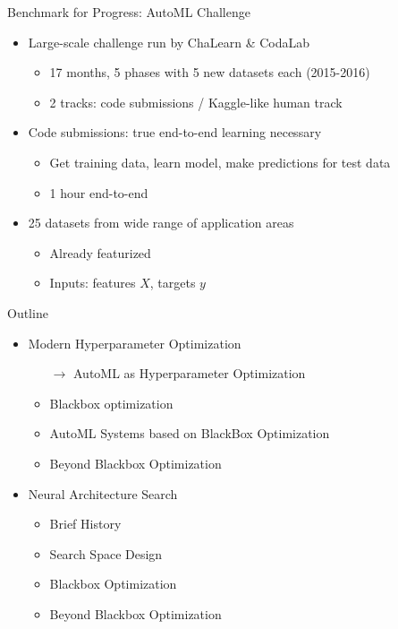 \begin{frame}[c]{Benchmark for Progress: AutoML Challenge}
\begin{itemize}
	\item \alert{Large-scale challenge run by ChaLearn \& CodaLab}
	\begin{itemize}
		\item 17 months, 5 phases with 5 new datasets each (2015-2016)
		\item 2 tracks: code submissions / Kaggle-like human track
	\end{itemize}
	\item \alert{Code submissions: true end-to-end learning necessary}
	\begin{itemize}
		\item Get training data, learn model, make predictions for test data
		\item 1 hour end-to-end
	\end{itemize}
	\item \alert{25 datasets from wide range of application areas}
		\begin{itemize}
			\item Already featurized
			\item Inputs: features $X$, targets $y$
		\end{itemize}
\end{itemize}
\end{frame}
\begin{frame}[c]{Outline}
\begin{itemize}
	\item Modern Hyperparameter Optimization
	\begin{itemize}
		\item[$\to$] AutoML as Hyperparameter Optimization
		\item Blackbox optimization
		\item AutoML Systems based on BlackBox Optimization
		\item Beyond Blackbox Optimization 
	\end{itemize}
	\item Neural Architecture Search
	\begin{itemize}
		\item Brief History
		\item Search Space Design
		\item Blackbox Optimization
		\item Beyond Blackbox Optimization
	\end{itemize}
\end{itemize}
\end{frame}
